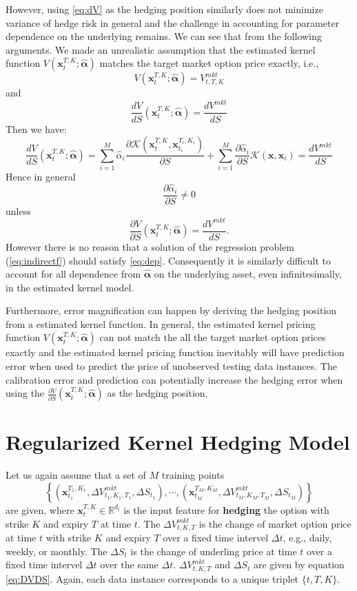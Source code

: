 \documentclass[letterpaper,12pt,titlepage,oneside,final]{book}
\numberwithin{equation}{section}
\theoremstyle{definition}
\newcommand{\vx}{\mathbf{x}}
\newcommand{\DT}{\Delta t}
\newcommand{\Real}{\mathbb{R}}
\newcommand{\valpha}{\pmb{\widehat{\alpha}}}
\newcommand{\Vmkt}{V^{mkt}}
\newcommand{\Smkt}{S}
\begin{document}
However, using \eqref{eq:dV} as the hedging position similarly does not minimize variance of hedge risk in general and the challenge in accounting for parameter dependence on the underlying remains. We can see that from the  following arguments. We made an unrealistic assumption that the estimated kernel function $V(\mathbf{x}_{t}^{T,K};\valpha)$ matches the target market option price exactly, i.e.,
$$
V(\mathbf{x}_{t}^{T,K};\valpha) = \Vmkt_{t,T,K}
$$
and $$\frac{d V}{d S}(\mathbf{x}_{t}^{T,K};\valpha)=\frac{d  \Vmkt}{d S}$$
Then we have:
$$
\frac{d V}{d S}(\mathbf{x}_{t}^{T,K};\valpha)=\sum_{i=1}^M \widehat{\alpha}_i \frac{\partial \mathcal{K}(\mathbf{x}_{t}^{T,K},\vx_{t_i}^{T_i,K_i})}{\partial S} + \sum_{i=1}^M \frac{\partial \widehat{\alpha}_i}{\partial S}\mathcal{K}(\vx,\vx_i)=\frac{d \Vmkt}{d S}
$$
Hence in general
$$
\frac{\partial \widehat{\alpha}_i}{\partial S} \neq 0
$$
unless
\begin{equation}\label{eq:dep}
\frac{\partial V}{\partial S}(\vx_{t}^{T,K};\valpha) = \frac{d  \Vmkt}{d S}.
\end{equation}
However there is no reason that a solution of the regression problem (\ref{eq:indirectf}) should satisfy \eqref{eq:dep}. Consequently it is similarly difficult to account for all dependence from $\valpha$ on the underlying asset, even infinitesimally, in the estimated kernel model.



Furthermore, error magnification can happen by deriving the hedging position from a estimated kernel function. In general, the estimated kernel pricing function $V(\mathbf{x}_{t}^{T,K};\valpha)$ can not match the all the target market option prices exactly and the  estimated kernel pricing function inevitably will have prediction error when used to predict the price of unobserved testing data instances. The calibration error and prediction can potentially increase the hedging error when using the $\frac{\partial V}{\partial S}(\vx_{t}^{T,K};\valpha)$ as the hedging position.


\section{Regularized Kernel Hedging Model}
\label{sec:KernelDirect}
Let us again assume that a set of $M$ training points 
\[
 \left\{ (\vx_{t_1}^{T_1,K_1},\Delta V^{mkt}_{t_1,K_1,T_1},\Delta \Smkt_{t_1}), \cdots, (\vx_{t_M}^{T_M,K_M},\Delta V^{mkt}_{t_M,K_M,T_M},\Delta \Smkt_{t_M})\right\} \]
 are given, where
$
\vx_{t}^{T,K}  \in \Real^{d_l}
$ is the input feature for \textbf{hedging} the option with strike $K$ and expiry $T$ at time $t$. The $\Delta V^{mkt}_{t,K,T}$ is the change of  market option price at time $t$ with strike $K$ and expiry $T$ over a fixed time intervel $\DT$, e.g., daily, weekly, or monthly. The $\Delta \Smkt_{t}$ is the change of  underling price at time $t$ over a fixed time intervel $\DT$ over the same $\DT$. 
$\Delta V^{mkt}_{t,K,T}$ and  $\Delta \Smkt_{t}$  are given by
equation \eqref{eq:DVDS}.
Again, each data instance corresponds to a unique triplet $\{t,T,K\}$.
\end{document}

